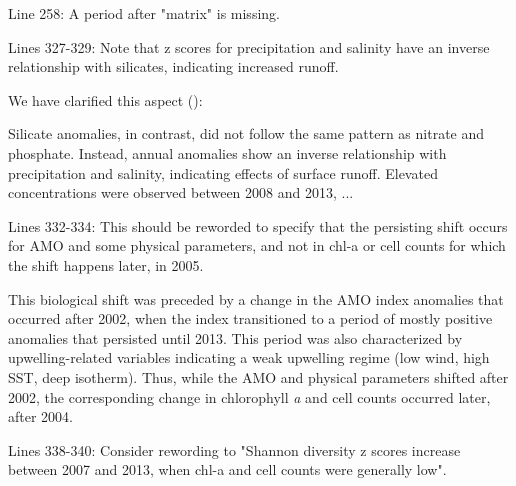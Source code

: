 \documentclass[12pt,english]{reviewresponse}
\begin{document}
\begin{revcomment}
Line 258: A period after "matrix" is missing.
\end{revcomment}
\begin{revresponse}
\end{revresponse}

\begin{revcomment}
Lines 327-329: Note that z scores for precipitation and salinity have an inverse relationship with silicates, indicating increased runoff.
\end{revcomment}
\begin{revresponse}
	We have clarified this aspect ():
    \begin{changes}
        Silicate anomalies, in contrast, did not follow the same pattern as nitrate and phosphate. Instead, annual anomalies show an inverse relationship with precipitation and salinity, indicating effects of surface runoff. Elevated concentrations were observed between 2008 and 2013, ...
    \end{changes}
\end{revresponse}

\begin{revcomment}
Lines 332-334: This should be reworded to specify that the persisting shift occurs for AMO and some physical parameters, and not in chl-a or cell counts for which the shift happens later, in 2005.
\end{revcomment}
\begin{revresponse}
    \begin{changes}
        This biological shift was preceded by a change in the AMO index anomalies that occurred after 2002, when the index transitioned to a period of mostly positive anomalies that persisted until 2013. This period was also characterized by upwelling-related variables indicating a weak upwelling regime (low wind, high SST, deep isotherm). Thus, while the AMO and physical parameters shifted after 2002, the corresponding change in chlorophyll \textit{a} and cell counts occurred later, after 2004.
    \end{changes}
\end{revresponse}

\begin{revcomment}
Lines 338-340: Consider rewording to "Shannon diversity z scores increase between 2007 and 2013, when chl-a and cell counts were generally low".
\end{revcomment}
\begin{revresponse}
\end{revresponse}
\end{document}
